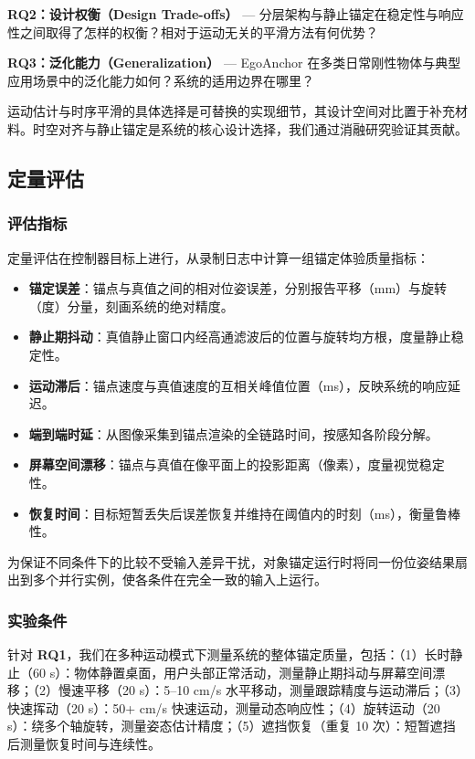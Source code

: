 \documentclass[review]{vgtc}
\begin{document}
\textbf{RQ2：设计权衡（Design Trade-offs）} --- 分层架构与静止锚定在稳定性与响应性之间取得了怎样的权衡？相对于运动无关的平滑方法有何优势？

\textbf{RQ3：泛化能力（Generalization）} --- EgoAnchor 在多类日常刚性物体与典型应用场景中的泛化能力如何？系统的适用边界在哪里？

运动估计与时序平滑的具体选择是可替换的实现细节，其设计空间对比置于补充材料。时空对齐与静止锚定是系统的核心设计选择，我们通过消融研究验证其贡献。

\subsection{定量评估}


\subsubsection{评估指标}


定量评估在控制器目标上进行，从录制日志中计算一组锚定体验质量指标：

\begin{itemize}
  \item \textbf{锚定误差}：锚点与真值之间的相对位姿误差，分别报告平移（mm）与旋转（度）分量，刻画系统的绝对精度。
  \item \textbf{静止期抖动}：真值静止窗口内经高通滤波后的位置与旋转均方根，度量静止稳定性。
  \item \textbf{运动滞后}：锚点速度与真值速度的互相关峰值位置（ms），反映系统的响应延迟。
  \item \textbf{端到端时延}：从图像采集到锚点渲染的全链路时间，按感知各阶段分解。
  \item \textbf{屏幕空间漂移}：锚点与真值在像平面上的投影距离（像素），度量视觉稳定性。
  \item \textbf{恢复时间}：目标短暂丢失后误差恢复并维持在阈值内的时刻（ms），衡量鲁棒性。
\end{itemize}

为保证不同条件下的比较不受输入差异干扰，对象锚定运行时将同一份位姿结果扇出到多个并行实例，使各条件在完全一致的输入上运行。

\subsubsection{实验条件}


针对 \textbf{RQ1}，我们在多种运动模式下测量系统的整体锚定质量，包括：（1）长时静止（60 s）：物体静置桌面，用户头部正常活动，测量静止期抖动与屏幕空间漂移；（2）慢速平移（20 s）：5--10 cm/s 水平移动，测量跟踪精度与运动滞后；（3）快速挥动（20 s）：50+ cm/s 快速运动，测量动态响应性；（4）旋转运动（20 s）：绕多个轴旋转，测量姿态估计精度；（5）遮挡恢复（重复 10 次）：短暂遮挡后测量恢复时间与连续性。
\end{document}
